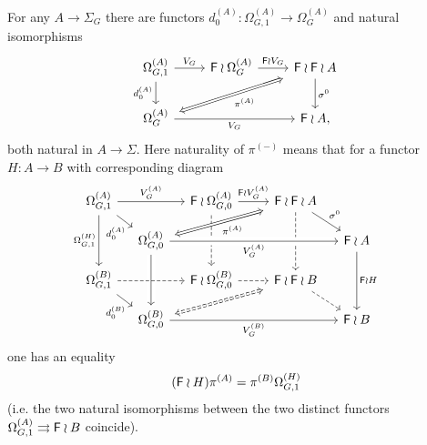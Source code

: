 \documentclass[a4paper,10pt]{article}%
\begin{document}
\begin{proposition}
For any $A \to \Sigma_G$ there are functors 
$d_0^{(A)}\colon \Omega_{G,1}^{(A)} \to \Omega_{G}^{(A)}$ and natural isomorphisms
\begin{equation}\label{SHUFFLEPERMA EQ}
	\begin{tikzcd}
	\Omega_{G,1}^{(A)} \ar{r}{V_G} \ar{d}[swap]{d_{0}^{(A)}}&
	\Fin \wr \Omega_{G}^{(A)} \ar{r}{\Fin \wr V_G} &
	|[alias=FFOmega]|\Fin \wr \Fin \wr A \ar{d}{\sigma^0}
\\
	|[alias=Omega]|\Omega_{G}^{(A)} \ar{rr}[swap]{V_G} &&
	\Fin \wr A,
	\arrow[Leftrightarrow, from=FFOmega, to=Omega,shorten <=0.15cm,,shorten >=0.15cm,"\pi^{(A)}"]
	\end{tikzcd}
\end{equation}
both natural in $A \to \Sigma$.
Here naturality of $\pi^{(\minus)}$ means that for a functor $H \colon A \to B$ with corresponding diagram
\begin{equation}\label{PICUBOIDAB EQ}
\begin{tikzcd}[column sep = small, row sep = small]
	\Omega_{G,1}^{(A)} \ar{rr}{V_G^{(A)}} \ar{rd}[swap,near end]{d^{(A)}_0} \ar{dd}[swap]{\Omega_{G,1}^{(H)}}
	&&
	\Fin \wr \Omega_{G,0}^{(A)} \ar{rr}{\Fin \wr V_G^{(A)}} \ar[dd,dashed]&&
	|[alias=FFOmegan]|\Fin \wr \Fin \wr A  \ar[dd,dashed] \ar{rd}{\sigma^0}
\\
	&
	|[alias=Omeganp1]|\Omega_{G,0}^{(A)} \ar[crossing over]{rrrr}[swap]{V_G^{(A)}} \ar[crossing over]{dd} &&&&
	\Fin \wr A \ar{dd}{\Fin \wr H}&
\\
	\Omega_{G,1}^{(B)} \ar[dashed]{rr} \ar{rd}[swap,near end]{d^{(B)}_0}&&
	\Fin \wr \Omega^{(B)}_{G,0} \ar[rr,dashed] &&
	|[alias=FFOmeganm1]|\Fin \wr \Fin \wr B \ar[rd,dashed] 
\\
	&
	|[alias=Omegan]|\Omega^{(B)}_{G,0} \ar{rrrr}[swap]{V_G^{(B)}} &&&&
	\Fin \wr B &
	\arrow[Leftrightarrow, from=Omeganp1, to=FFOmegan,shorten <=0.15cm,shorten >=0.15cm,swap,"\pi^{(A)}"]
	\arrow[Leftrightarrow, from=FFOmeganm1, to=Omegan,shorten <=0.15cm,shorten >=0.15cm,dashed]
\end{tikzcd}
\end{equation}
one has an equality 
\[(\mathsf{F} \wr H)\pi^{(A)} = \pi^{(B)}\Omega_{G,1}^{(H)}\]
 (i.e. the two natural isomorphisms between the two distinct functors $\Omega_{G,1}^{(A)} \rightrightarrows \mathsf{F} \wr B$ coincide).
\end{proposition}
\end{document}
